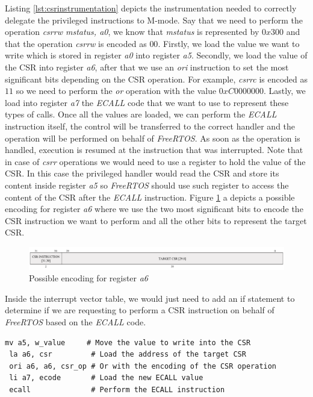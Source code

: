 Listing \ref{lst:csrinstrumentation} depicts the instrumentation needed to
correctly delegate the privileged instructions to M-mode. Say that we need to perform
the operation \textit{csrrw mstatus, a0}, we know that \textit{mstatus} is
represented by $0x300$ and that the operation \textit{csrrw} is encoded as $00$.
Firstly, we load the value we want to write which is stored in register \textit{a0}
into register \textit{a5}. Secondly, we load the value of the CSR into register \textit{a6},
after that we use an \textit{ori} instruction to set the most significant bits
depending on the CSR operation. For example, \textit{csrrc} is encoded as $11$ so
we need to perform the \textit{or} operation with the value $0xC0000000$. Lastly,
we load into register \textit{a7} the \textit{ECALL} code that we want to use to
represent these types of calls. Once all the values are loaded, we can perform
the \textit{ECALL} instruction itself, the control will be transferred to the
correct handler and the operation will be performed on behalf of \textit{FreeRTOS}.
As soon as the operation is handled, execution is resumed at the instruction that
was interrupted. Note that in case of \textit{csrr} operations we would need to use
a register to hold the value of the CSR. In this case the privileged handler
would read the CSR and store its content inside register \textit{a5} so \textit{FreeRTOS}
should use such register to access the content of the CSR after the \textit{ECALL}
instruction. Figure \ref{fig:a6encoding} a depicts a possible encoding for
register \textit{a6} where we use the two most significant bits to encode the CSR
instruction we want to perform and all the other bits to represent the target CSR.
\\
\begin{figure}[htbp]
  \centering
  \includegraphics[width=.9\linewidth]{images/freertos_encoding.png}
  \caption{Possible encoding for register \textit{a6}}
  \label{fig:a6encoding}
\end{figure}

Inside the interrupt vector table, we would just need to add an if statement to
determine if we are requesting to perform a CSR instruction on behalf of \textit{FreeRTOS}
based on the \textit{ECALL} code. \\ \begin{lstlisting}[style=Assembly, caption = \textit{FreeRTOS} instrumentation for Control and Status Register operations, label={lst:csrinstrumentation}]
 mv a5, w_value     # Move the value to write into the CSR
 la a6, csr         # Load the address of the target CSR
 ori a6, a6, csr_op # Or with the encoding of the CSR operation
 li a7, ecode       # Load the new ECALL value
 ecall              # Perform the ECALL instruction
\end{lstlisting}

